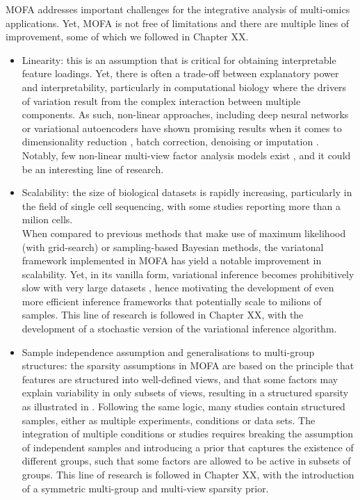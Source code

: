 MOFA addresses important challenges for the integrative analysis of multi-omics applications. Yet, MOFA is not free of limitations and there are multiple lines of improvement, some of which we followed in Chapter XX.\\
\begin{itemize}

	\item Linearity: this is an assumption that is critical for obtaining interpretable feature loadings. Yet, there is often a trade-off between explanatory power and interpretability, particularly in computational biology where the drivers of variation result from the complex interaction between multiple components. As such, non-linear approaches, including deep neural networks or variational autoencoders have shown promising results when it comes to dimensionality reduction \cite{Lin2017,Ding2018,Lopez2018}, batch correction\cite{Lopez2018}, denoising \cite{Eraslan2019} or imputation \cite{Lin2016}. Notably, few non-linear multi-view factor analysis models exist \cite{Damianou2016}, and it could be an interesting line of research.

	\item Scalability: the size of biological datasets is rapidly increasing, particularly in the field of single cell sequencing, with some studies reporting more than a milion cells\cite{Svensson2018,Cao2019}. \\
	When compared to previous methods that make use of maximum likelihood (with grid-search) or sampling-based Bayesian methods,  the variatonal framework implemented in MOFA has yield a notable improvement in scalability. Yet, in its vanilla form, variational inference becomes prohibitively slow with very large datasets \cite{Hoffman2013,Blei2016,Hoffman2014}, hence motivating the development of even more efficient inference frameworks that potentially scale to milions of samples. This line of research is followed in Chapter XX, with the development of a stochastic version of the variational inference algorithm.

	\item Sample independence assumption and generalisations to multi-group structures: the sparsity assumptions in MOFA are based on the principle that features are structured into well-defined views, and that some factors may explain variability in only subsets of views, resulting in a structured sparsity as illustrated in . Following the same logic, many studies contain structured samples, either as multiple experiments, conditions or data sets. The integration of multiple conditions or studies requires breaking the assumption of independent samples and introducing a prior that captures the existence of different groups, such that some factors are allowed to be active in subsets of groups. This line of research is followed in Chapter XX, with the introduction of a symmetric multi-group and multi-view sparsity prior.


\end{itemize}
